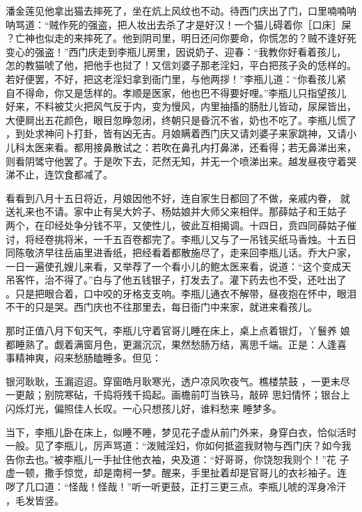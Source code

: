 潘金莲见他拿出猫去摔死了，坐在炕上风纹也不动。待西门庆出了门，口里喃喃呐
呐骂道：“贼作死的强盗，把人妆出去杀了才是好汉！一个猫儿碍着你［口床］屎
？亡神也似走的来摔死了。他到阴司里，明日还问你要命，你慌怎的？贼不逢好死
变心的强盗！”西门庆走到李瓶儿房里，因说奶子、迎春：“我教你好看着孩儿，
怎的教猫唬了他，把他手也挝了！又信刘婆子那老淫妇，平白把孩子灸的恁样的。
若好便罢，不好，把这老淫妇拿到衙门里，与他两拶！”李瓶儿道：“你看孩儿紧
自不得命，你又是恁样的。孝顺是医家，他也巴不得要好哩。”李瓶儿只指望孩儿
好来，不料被艾火把风气反于内，变为慢风，内里抽搐的肠肚儿皆动，尿屎皆出，
大便屙出五花颜色，眼目忽睁忽闭，终朝只是昏沉不省，奶也不吃了。李瓶儿慌了
，到处求神问卜打卦，皆有凶无吉。月娘瞒着西门庆又请刘婆子来家跳神，又请小
儿科太医来看。都用接鼻散试之：若吹在鼻孔内打鼻涕，还看得；若无鼻涕出来，
则看阴骘守他罢了。于是吹下去，茫然无知，并无一个喷涕出来。越发昼夜守着哭
涕不止，连饮食都减了。

看看到八月十五日将近，月娘因他不好，连自家生日都回了不做，亲戚内眷，
就送礼来也不请。家中止有吴大妗子、杨姑娘并大师父来相伴。那薛姑子和王姑子
两个，在印经处争分钱不平，又使性儿，彼此互相揭调。十四日，贲四同薛姑子催
讨，将经卷挑将米，一千五百卷都完了。李瓶儿又与了一吊钱买纸马香烛。十五日
同陈敬济早往岳庙里进香纸，把经看着都散施尽了，走来回李瓶儿话。乔大户家，
一日一遍使孔嫂儿来看，又举荐了一个看小儿的鲍太医来看，说道：“这个变成天
吊客忤，治不得了。”白与了他五钱银子，打发去了。灌下药去也不受，还吐出了
。只是把眼合着，口中咬的牙格支支响。李瓶儿通衣不解带，昼夜抱在怀中，眼泪
不干的只是哭。西门庆也不往那里去，每日衙门中来家，就进来看孩儿。

那时正值八月下旬天气，李瓶儿守着官哥儿睡在床上，桌上点着银灯，丫鬟养
娘都睡熟了。觑着满窗月色，更漏沉沉，果然愁肠万结，离思千端。正是：人逢喜
事精神爽，闷来愁肠瞌睡多。但见：

银河耿耿，玉漏迢迢。穿窗皓月耿寒光，透户凉风吹夜气。樵楼禁鼓
，一更未尽一更敲；别院寒砧，千捣将残千捣起。画檐前叮当铁马，敲碎
思妇情怀；银台上闪烁灯光，偏照佳人长叹。一心只想孩儿好，谁料愁来
睡梦多。

当下，李瓶儿卧在床上，似睡不睡，梦见花子虚从前门外来，身穿白衣，恰似活时
一般。见了李瓶儿，厉声骂道：“泼贼淫妇，你如何抵盗我财物与西门庆？如今我
告你去也。”被李瓶儿一手扯住他衣袖，央及道：“好哥哥，你饶恕我则个！”花
子虚一顿，撒手惊觉，却是南柯一梦。醒来，手里扯着却是官哥儿的衣衫袖子。连
哕了几口道：“怪哉！怪哉！”听一听更鼓，正打三更三点。李瓶儿唬的浑身冷汗
，毛发皆竖。

